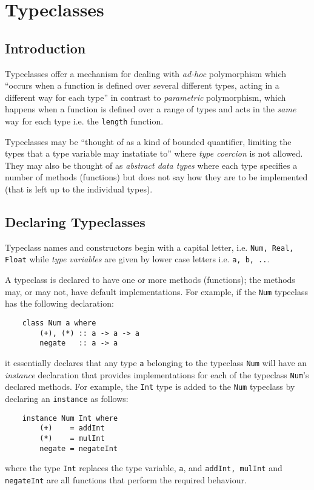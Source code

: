 \chapter{Typeclasses}
\section{Introduction}
Typeclasses offer a mechanism for dealing with {\em ad-hoc} polymorphism which ``occurs when a function is defined over several different types, acting in a different way for each type''  in contrast to  {\em parametric} polymorphism, which happens when a function is defined over a range of types and acts in  the {\em same} way  for each type i.e. the \texttt{length} function.  \citep {WADLER-BLOTT}

Typeclasses may be ``thought of as a kind of bounded quantifier, limiting the types that a type variable may instatiate to'' where {\em type coercion} is not allowed. They may also be thought of as {\em abstract data types} where each type specifies a number of methods (functions) but does not say how they are to be implemented (that is left up to the individual types).  \citep {WADLER-BLOTT}

\section{Declaring Typeclasses}
Typeclass names and constructors begin with a capital letter, i.e.  \texttt{Num, Real, Float} while {\em type variables} are given by lower case letters i.e. \texttt{a, b, ..}.

A typeclass is declared to have one or more methods (functions); the methods may, or may not, have default implementations. For example, if the \texttt{Num} typeclass has the following declaration:
\begin{lstlisting}
	class Num a where
		(+), (*) :: a -> a -> a
		negate   :: a -> a
\end{lstlisting}
it essentially declares that any type \texttt{a} belonging to the typeclass \texttt{Num} will have an {\em instance} declaration that provides implementations for each of the typeclass \texttt{Num}'s declared methods. For example, the \texttt{Int} type is added to the \texttt{Num} typeclass by declaring an \texttt{instance} as follows:
\begin{lstlisting}
	instance Num Int where
		(+)    = addInt    
		(*)    = mulInt
		negate = negateInt
\end{lstlisting}
where the type \texttt{Int} replaces the type variable, \texttt{a}, and \texttt{addInt, mulInt} and \texttt{negateInt} are all functions that perform the required behaviour.

